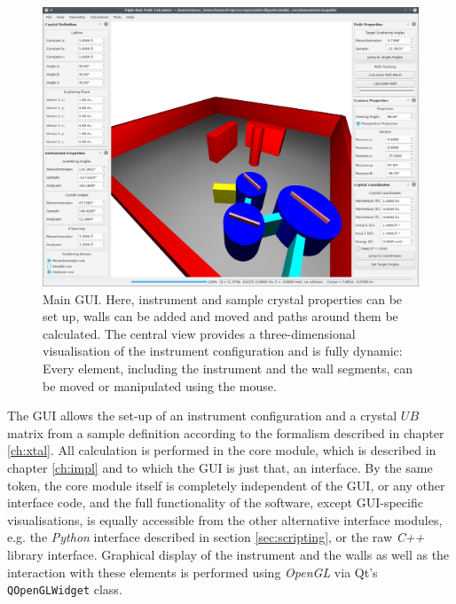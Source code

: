 \begin{figure}[htb]
		\begin{center}
			\includegraphics[width = 1 \textwidth]{figures/gui}
		\end{center}
	\caption{Main GUI. Here, instrument and sample crystal properties can be set up,
		walls can be added and moved and paths around them be calculated.
		The central view provides a three-dimensional visualisation of the instrument
		configuration and is fully dynamic: Every element, including the instrument
		and the wall segments, can be moved or manipulated using the mouse.
		\label{fig:gui}}
\end{figure}

The GUI allows the set-up of an instrument configuration and a crystal $UB$ matrix from a
sample definition according to the formalism described in chapter \ref{ch:xtal}.
All calculation is performed in the core module, which is described in chapter \ref{ch:impl}
and to which the GUI is just that, an interface. By the same token, the core module itself is
completely independent of the GUI, or any other interface code, and the full functionality
of the software, except GUI-specific visualisations, is equally accessible from the other
alternative interface modules, e.g. the \textit{Python} interface described in section
\ref{sec:scripting}, or the raw \textit{C++} library interface. Graphical display of the
instrument and the walls as well as the interaction with these elements is performed
using \textit{OpenGL} \cite{web_OpenGL} via Qt's \lstinline[language=C++]|QOpenGLWidget|
\cite{web_QOpenGLWidget} class.



